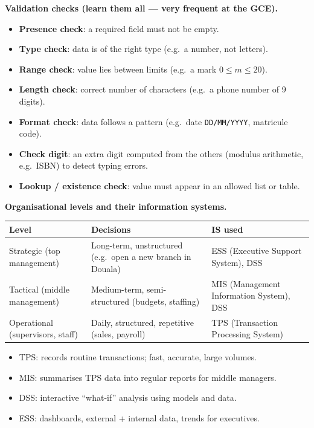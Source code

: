 \documentclass[11pt]{article}
\newcommand{\cle}[1]{{\popxbold\color{popdark}#1}}
\begin{document}
\begin{bilan}
\textbf{Validation checks (learn them all — very frequent at the GCE).}
\begin{itemize}
  \item \textbf{Presence check}: a required field must not be empty.
  \item \textbf{Type check}: data is of the right type (e.g.\ a number, not letters).
  \item \textbf{Range check}: value lies between limits (e.g.\ a mark $0 \le m \le 20$).
  \item \textbf{Length check}: correct number of characters (e.g.\ a phone number of 9 digits).
  \item \textbf{Format check}: data follows a pattern (e.g.\ date \texttt{DD/MM/YYYY}, matricule code).
  \item \textbf{Check digit}: an extra digit computed from the others (modulus arithmetic, e.g.\ ISBN) to detect typing errors.
  \item \textbf{Lookup / existence check}: value must appear in an allowed list or table.
\end{itemize}

\textbf{Organisational levels and their information systems.}
\begin{center}
\begin{tabularx}{\linewidth}{|l|X|X|}\hline
\rowcolor{popblueL} \textbf{Level} & \textbf{Decisions} & \textbf{IS used} \\ \hline
Strategic (top management) & Long-term, unstructured (e.g.\ open a new branch in Douala) & ESS (Executive Support System), DSS \\ \hline
Tactical (middle management) & Medium-term, semi-structured (budgets, staffing) & MIS (Management Information System), DSS \\ \hline
Operational (supervisors, staff) & Daily, structured, repetitive (sales, payroll) & TPS (Transaction Processing System) \\ \hline
\end{tabularx}
\end{center}
\begin{itemize}
  \item \cle{TPS}: records routine transactions; fast, accurate, large volumes.
  \item \cle{MIS}: summarises TPS data into regular reports for middle managers.
  \item \cle{DSS}: interactive ``what-if'' analysis using models and data.
  \item \cle{ESS}: dashboards, external + internal data, trends for executives.
\end{itemize}


\end{bilan}
\end{document}
